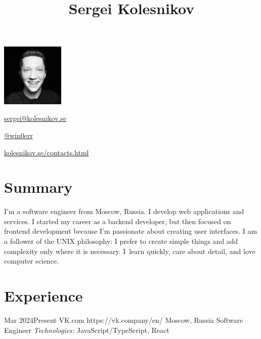 \documentclass[10pt]{article}
\begin{document}
\begin{floatingfigure}[r]{3cm}
	\vspace{-.5\baselineskip}
	\includegraphics[width=3cm]{userpic}
\end{floatingfigure}

\title{Sergei Kolesnikov}
\vspace{-.5\baselineskip}

\begin{horizontalitemize}
	\item \href{mailto:sergei@kolesnikov.se}{sergei@kolesnikov.se}
	\item \href{https://t.me/win0err}{@win0err}
	\item \href{https://kolesnikov.se/contacts.html}{kolesnikov.se/contacts.html}
\end{horizontalitemize}

\begin{summary}
\end{summary}


\vspace{-2\baselineskip}
\section{Summary}

I'm a software engineer from Moscow, Russia. I develop web applications and services.
I started my career as a backend developer, but then focused on frontend development because I'm passionate about creating user interfaces.
I am a follower of the UNIX philosophy: I prefer to create simple things and add complexity only where it is necessary.
I~learn quickly, care about detail, and love computer science.


\section{Experience}

\job
	{Mar 2024}{Present}
	{VK.com}
	{https://vk.company/en/}  %
	{Moscow, Russia}
	{Software Engineer}
	{
	  \textit{Technologies:} JavaScript/TypeScript, React
	}
\end{document}
